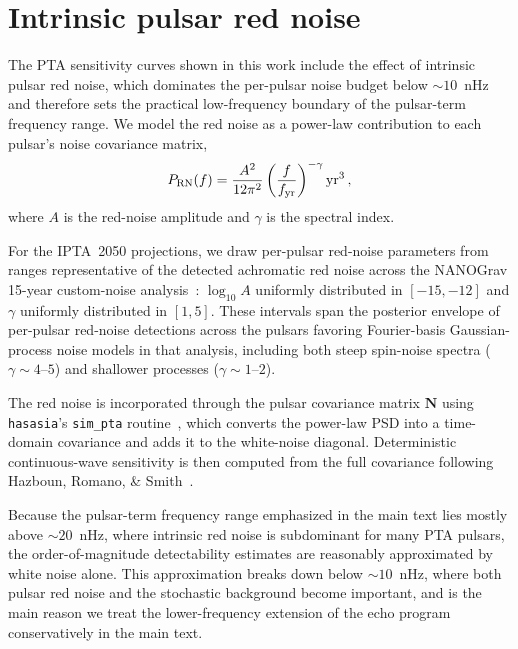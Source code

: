 \documentclass[aps,prx,twocolumn,superscriptaddress,nofootinbib,longbibliography]{revtex4-2}
\begin{document}
\section{Intrinsic pulsar red noise}\label{app:rednoise}

The PTA sensitivity curves shown in this work include the effect of intrinsic pulsar red noise, which dominates the per-pulsar noise budget below $\sim10$~nHz and therefore sets the practical low-frequency boundary of the pulsar-term frequency range. We model the red noise as a power-law contribution to each pulsar's noise covariance matrix,
\begin{equation}\label{eq:rn_psd}
 P_{\rm RN}(f) = \frac{A^2}{12\pi^2}
 \left(\frac{f}{f_{\rm yr}}\right)^{-\gamma}\mathrm{yr}^3\,,
\end{equation}
where $A$ is the red-noise amplitude and $\gamma$ is the spectral index.

For the IPTA~2050 projections, we draw per-pulsar red-noise parameters from ranges representative of the detected achromatic red noise across the NANOGrav 15-year custom-noise analysis~\cite{NG15noise}: $\log_{10}A$ uniformly distributed in $[-15,-12]$ and $\gamma$ uniformly distributed in $[1,5]$. These intervals span the posterior envelope of per-pulsar red-noise detections across the pulsars favoring Fourier-basis Gaussian-process noise models in that analysis, including both steep spin-noise spectra ($\gamma\sim4$--$5$) and shallower processes ($\gamma\sim1$--$2$).

The red noise is incorporated through the pulsar covariance matrix $\mathbf{N}$ using \texttt{hasasia}'s \texttt{sim\_pta} routine~\cite{Hazboun2019hasasia}, which converts the power-law PSD into a time-domain covariance and adds it to the white-noise diagonal. Deterministic continuous-wave sensitivity is then computed from the full covariance following Hazboun, Romano, \& Smith~\cite{HazbounRS2019}.

Because the pulsar-term frequency range emphasized in the main text lies mostly above $\sim20$~nHz, where intrinsic red noise is subdominant for many PTA pulsars, the order-of-magnitude detectability estimates are reasonably approximated by white noise alone. This approximation breaks down below $\sim10$~nHz, where both pulsar red noise and the stochastic background become important, and is the main reason we treat the lower-frequency extension of the echo program conservatively in the main text.

\end{document}
